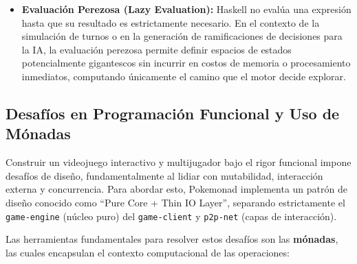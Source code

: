 \begin{itemize}
    \item \textbf{Evaluación Perezosa (Lazy Evaluation):} Haskell no evalúa una expresión hasta que su resultado es estrictamente necesario. En el contexto de la simulación de turnos o en la generación de ramificaciones de decisiones para la IA, la evaluación perezosa permite definir espacios de estados potencialmente gigantescos sin incurrir en costos de memoria o procesamiento inmediatos, computando únicamente el camino que el motor decide explorar.
\end{itemize}

\subsection{Desafíos en Programación Funcional y Uso de Mónadas}

Construir un videojuego interactivo y multijugador bajo el rigor funcional impone desafíos de diseño, fundamentalmente al lidiar con mutabilidad, interacción externa y concurrencia. Para abordar esto, Pokemonad implementa un patrón de diseño conocido como ``Pure Core + Thin IO Layer'', separando estrictamente el \texttt{game-engine} (núcleo puro) del \texttt{game-client} y \texttt{p2p-net} (capas de interacción). 

Las herramientas fundamentales para resolver estos desafíos son las \textbf{mónadas}, las cuales encapsulan el contexto computacional de las operaciones:

